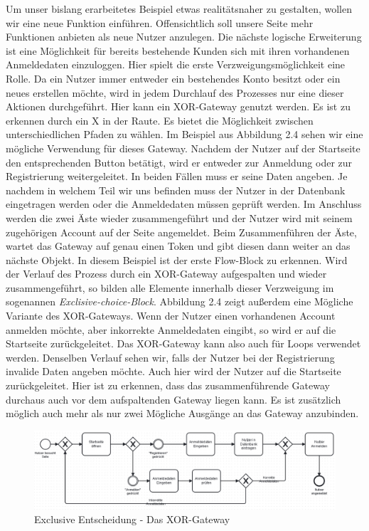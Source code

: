 Um unser bislang erarbeitetes Beispiel etwas realitätsnaher zu gestalten, wollen wir eine neue Funktion einführen. Offensichtlich soll unsere Seite mehr Funktionen anbieten als neue Nutzer anzulegen. Die nächste logische Erweiterung ist eine Möglichkeit für bereits bestehende Kunden sich mit ihren vorhandenen Anmeldedaten einzuloggen. Hier spielt die erste Verzweigungsmöglichkeit eine Rolle. Da ein Nutzer immer entweder ein bestehendes Konto besitzt oder ein neues erstellen möchte, wird in jedem Durchlauf des Prozesses nur eine dieser Aktionen durchgeführt. Hier kann ein XOR-Gateway genutzt werden. Es ist zu erkennen durch ein X in der Raute. Es bietet die Möglichkeit zwischen unterschiedlichen Pfaden zu wählen. Im Beispiel aus Abbildung 2.4 sehen wir eine mögliche Verwendung für dieses Gateway. Nachdem der Nutzer auf der Startseite den entsprechenden Button betätigt, wird er entweder zur Anmeldung oder zur Registrierung weitergeleitet. In beiden Fällen muss er seine Daten angeben. Je nachdem in welchem Teil wir uns befinden muss der Nutzer in der Datenbank eingetragen werden oder die Anmeldedaten müssen geprüft werden. Im Anschluss werden die zwei Äste wieder zusammengeführt und der Nutzer wird mit seinem zugehörigen Account auf der Seite angemeldet. Beim Zusammenführen der Äste, wartet das Gateway auf genau einen Token und gibt diesen dann weiter an das nächste Objekt. In diesem Beispiel ist der erste Flow-Block zu erkennen. Wird der Verlauf des Prozess durch ein XOR-Gateway aufgespalten und wieder zusammengeführt, so bilden alle Elemente innerhalb dieser Verzweigung im sogenannen \emph{Exclisive-choice-Block}. Abbildung 2.4 zeigt außerdem eine Mögliche Variante des XOR-Gateways. Wenn der Nutzer einen vorhandenen Account anmelden möchte, aber inkorrekte Anmeldedaten eingibt, so wird er auf die Startseite zurückgeleitet. Das XOR-Gateway kann also auch für Loops verwendet werden. Denselben Verlauf sehen wir, falls der Nutzer bei der Registrierung invalide Daten angeben möchte. Auch hier wird der Nutzer auf die Startseite zurückgeleitet. Hier ist zu erkennen, dass das zusammenführende Gateway durchaus auch vor dem aufspaltenden Gateway liegen kann. Es ist zusätzlich möglich auch mehr als nur zwei Mögliche Ausgänge an das Gateway anzubinden. 



\begin{figure}
\centering
\includegraphics[scale=0.5]{Figures/Beispiel5}
\decoRule
\caption[XOR-Gateway]{Exclusive Entscheidung - Das XOR-Gateway}
\label{fig:Task}
\end{figure}


